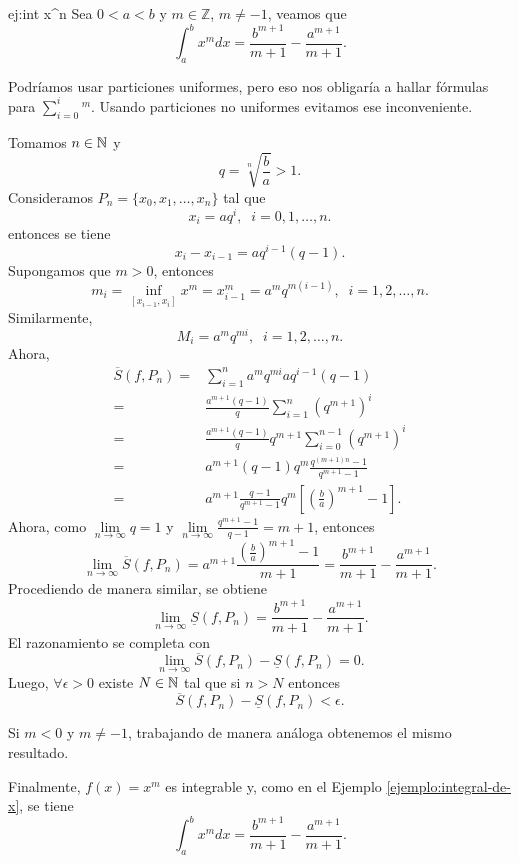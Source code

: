 \begin{ejemplo}{ej:int x^n} Sea $0< a<b$ y $m\in\mathbb{Z}$, $m\neq -1$,  veamos que 
\[
 \int_a^b x^m dx=\frac{b^{m+1}}{m+1}-\frac{a^{m+1}}{m+1}.
\]

\begin{demo}
Podr\'iamos usar particiones uniformes, pero eso nos obligar\'ia a hallar f\'ormulas para $\sum\limits_{i=0}^i^m$. Usando particiones no uniformes evitamos ese inconveniente. 

Tomamos $n \in \mathbb{N}$ y 
\[
q=\sqrt[n]{\frac{b}{a}}>1.
\]
Consideramos $P_n=\{x_0,x_1,\ldots,x_n\}$ tal que
\[
x_i=aq^i, \;\;i=0,1,\ldots,n.
\]
entonces se tiene
\[
x_i-x_{i-1}=aq^{i-1}(q-1).
\]
Supongamos que $m>0$, entonces
\[
m_i=\inf\limits_{[x_{i-1},x_i]} x^m=x_{i-1}^m=a^mq^{m(i-1)}, \;\;i=1,2,\ldots,n.
\]
Similarmente, 
\[
M_i=a^mq^{mi},\;\;i=1,2,\ldots,n.
\]
Ahora, 
\[
\begin{split}
\overline{S}(f,P_n)=&
\sum\limits_{i=1}^n a^m q^{mi} aq^{i-1}(q-1)
\\
=&\frac{a^{m+1}(q-1)}{q}
\sum\limits_{i=1}^n (q^{m+1})^i
\\
=& \frac{a^{m+1}(q-1)}{q}q^{m+1}
\sum\limits_{i=0}^{n-1} (q^{m+1})^i
\\
=& a^{m+1}(q-1) q^m 
\frac{q^{(m+1)n }-1}{q^{m+1}-1}
\\
=&
a^{m+1}  \frac{q-1}{q^{m+1}-1} q^m \left[ \left(\frac{b}{a}\right)^{m+1}-1\right]
.
\end{split}
\]
Ahora, como $\lim\limits_{n \to \infty} q=1$ y 
$
\lim\limits_{n \to \infty} \frac{q^{m+1}-1}{q-1}=m+1
$, entonces
\[
\lim\limits_{n \to \infty} \overline{S}(f,P_n)=a^{m+1}
\frac{\left(\frac{b}{a}\right)^{m+1}-1}{m+1}=\frac{b^{m+1}}{m+1}-\frac{a^{m+1}}{m+1}.
\]
Procediendo de manera similar, se obtiene
\[
\lim\limits_{n \to \infty} \underline{S}(f,P_n)=
\frac{b^{m+1}}{m+1}-\frac{a^{m+1}}{m+1}.
\]
El razonamiento se completa con 
\[
\lim\limits_{n \to \infty}
\overline{S}(f,P_n)-\underline{S}(f, P_n)=0.
\]
Luego, $\forall \epsilon>0$ existe $N\in \mathbb{N}$ tal que si $n>N$ entonces
\[\overline{S}(f,P_n)-\underline{S}(f, P_n)<\epsilon.\]

Si $m<0$  y $m \neq -1$, trabajando de manera an\'aloga obtenemos el mismo resultado. 

Finalmente, $f(x)=x^m$ es integrable  y, como en el Ejemplo \ref{ejemplo:integral-de-x}, se tiene
\[\int_a^b x^m dx=\frac{b^{m+1}}{m+1}-\frac{a^{m+1}}{m+1}.\]
\end{demo}
\end{ejemplo}

